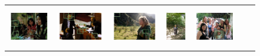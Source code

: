 \begin{figure}[htb]
\begin{tabular}{ccccccc}
      \includegraphics[height=1.8cm]{figures/hm_examples/1s_bbox_2009_004323} &
      \includegraphics[height=1.8cm]{figures/hm_examples/1s_bbox_2009_004784} &
      \includegraphics[height=1.8cm]{figures/hm_examples/1s_bbox_2009_005222} &
      \includegraphics[height=1.8cm]{figures/hm_examples/1s_bbox_2009_002715} &
      \includegraphics[height=1.8cm]{figures/hm_examples/1s_bbox_2010_005967} \\[3pt]


\end{tabular}
\end{figure}
